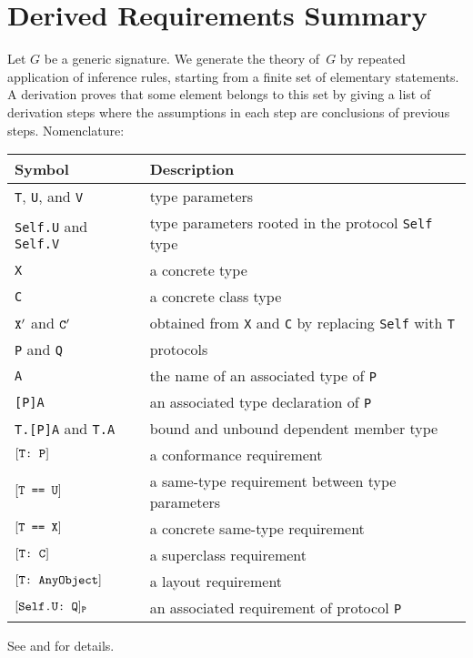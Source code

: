 \documentclass[../generics]{subfiles}
\begin{document}
\chapter{Derived Requirements Summary}\label{derived summary}

\index{$\vdash$}

Let $G$ be a generic signature. We generate the theory of~$G$ by repeated application of inference rules, starting from a finite set of elementary statements. A derivation proves that some element belongs to this set by giving a list of derivation steps where the assumptions in each step are conclusions of previous steps. Nomenclature:
\begin{center}
\begin{tabular}{ll}
\toprule
\textbf{Symbol}&\textbf{Description}\\
\midrule
\texttt{T}, \texttt{U}, and \texttt{V}&\index{type parameter!summary}type parameters\\
\texttt{Self.U} and \texttt{Self.V}&type parameters rooted in the \index{protocol Self type!summary}protocol \texttt{Self} type\\
\texttt{X}&a concrete type\\
\texttt{C}&a concrete \index{class type!summary}class type\\
$\texttt{X}^\prime$ and $\texttt{C}^\prime$&obtained from \texttt{X} and \texttt{C} by replacing \texttt{Self} with \texttt{T}\\
\texttt{P} and \texttt{Q}&protocols\\
\texttt{A}&the name of an \index{associated type declaration!summary}associated type of \texttt{P}\\
\texttt{[P]A}&an associated type declaration of \texttt{P}\\
\texttt{T.[P]A} and \texttt{T.A}&\index{bound dependent member type!summary}bound and \index{unbound dependent member type!summary}unbound dependent member type\\
$[\texttt{T:~P}]$&a \index{conformance requirement!summary}conformance requirement\\
$[\texttt{T == U}]$&a \index{same-type requirement!summary}same-type requirement between type parameters\\
$[\texttt{T == X}]$&a concrete same-type requirement\\
$[\texttt{T:~C}]$&a \index{superclass requirement!summary}superclass requirement\\
$[\texttt{T:~AnyObject}]$&a \index{layout requirement!summary}layout requirement\\
$[\texttt{Self.U:~Q}]_\texttt{P}$&an \index{associated requirement!summary}associated requirement of protocol \texttt{P}\\
\bottomrule
\end{tabular}
\end{center}
See  and  for details.
\end{document}

